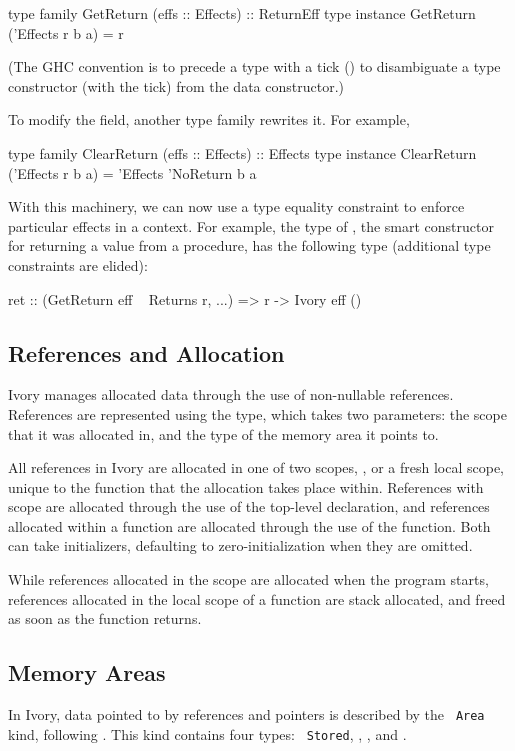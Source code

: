 \begin{code}
type family   GetReturn (effs :: Effects) :: ReturnEff
type instance GetReturn ('Effects r b a) = r
\end{code}

\noindent
(The GHC convention is to precede a type with a tick () to disambiguate a
type constructor (with the tick) from the data constructor.)

To modify the field, another type family rewrites it. For example,

\begin{code}
type family   ClearReturn (effs :: Effects) :: Effects
type instance ClearReturn ('Effects r b a) =
  'Effects 'NoReturn b a
\end{code}

With this machinery, we can now use a type equality constraint to enforce
particular effects in a context. For example, the type of , the smart
constructor for returning a value from a procedure, has the following type
(additional type constraints are elided):

\begin{code}
ret :: (GetReturn eff ~ Returns r, ...)
    => r -> Ivory eff ()
\end{code}


\subsection{References and Allocation}
\label{sec:ref}
Ivory manages allocated data through the use of non-nullable references.
References are represented using the  type, which takes two parameters:
the scope that it was allocated in, and the type of the memory area it points
to.

All references in Ivory are allocated in one of two scopes, , or a
fresh local scope, unique to the function that the allocation takes place
within.  References with  scope are allocated through the use of the
 top-level declaration, and references allocated within a function are
allocated through the use of the  function.  Both can take
initializers, defaulting to zero-initialization when they are omitted.

While references allocated in the  scope are allocated when the
program starts, references allocated in the local scope of a function are stack
allocated, and freed as soon as the function returns.

\subsection{Memory Areas}
In Ivory, data pointed to by references and pointers is described by the {\tt
Area} kind, following \cite{memareas}.  This kind contains four types: {\tt
Stored}, , , and .

